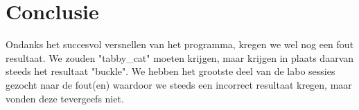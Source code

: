 \documentclass[a4paper, 12pt, one column]{article}
\begin{document}
\section{Conclusie}
Ondanks het succesvol versnellen van het programma, kregen we wel nog een fout resultaat.
We zouden "tabby\_cat" moeten krijgen, maar krijgen in plaats daarvan steeds het resultaat "buckle". We hebben het grootste deel
van de labo sessies gezocht naar de fout(en) waardoor we steeds een incorrect resultaat kregen, maar vonden deze tevergeefs niet.


\end{document}
